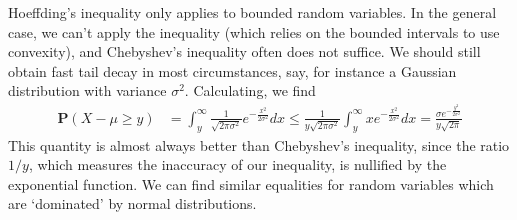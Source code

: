 Hoeffding's inequality only applies to bounded random variables. In the general case, we can't apply the inequality (which relies on the bounded intervals to use convexity), and Chebyshev's inequality often does not suffice. We should still obtain fast tail decay in most circumstances, say, for instance a Gaussian distribution with variance $\sigma^2$. Calculating, we find
%
\begin{align*}
    \mathbf{P}(X - \mu \geq y) &= \int_{y}^\infty \frac{1}{\sqrt{2 \pi \sigma^2}} e^{-\frac{x^2}{2 \sigma^2}} dx \leq \frac{1}{y \sqrt{2 \pi \sigma^2}} \int_{y}^\infty x e^{- \frac{x^2}{2\sigma^2}} dx = \frac{\sigma e^{- \frac{y^2}{2 \sigma^2}}}{y \sqrt{2 \pi}}
\end{align*}
%
This quantity is almost always better than Chebyshev's inequality, since the ratio $1/y$, which measures the inaccuracy of our inequality, is nullified by the exponential function. We can find similar equalities for random variables which are `dominated' by normal distributions.

